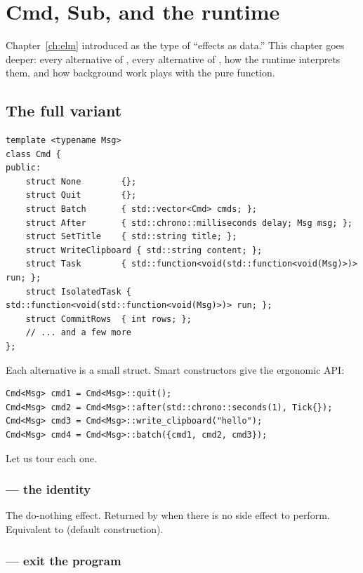 \chapter{Cmd, Sub, and the runtime}
\label{ch:cmdsub}

Chapter~\ref{ch:elm} introduced  as the type of
``effects as data.'' This chapter goes deeper: every alternative of
, every alternative of , how the runtime
interprets them, and how background work plays with the pure
 function.

\section{The full  variant}

\begin{lstlisting}
template <typename Msg>
class Cmd {
public:
    struct None        {};
    struct Quit        {};
    struct Batch       { std::vector<Cmd> cmds; };
    struct After       { std::chrono::milliseconds delay; Msg msg; };
    struct SetTitle    { std::string title; };
    struct WriteClipboard { std::string content; };
    struct Task        { std::function<void(std::function<void(Msg)>)> run; };
    struct IsolatedTask { std::function<void(std::function<void(Msg)>)> run; };
    struct CommitRows  { int rows; };
    // ... and a few more
};
\end{lstlisting}

Each alternative is a small struct. Smart constructors give the
ergonomic API:

\begin{lstlisting}
Cmd<Msg> cmd1 = Cmd<Msg>::quit();
Cmd<Msg> cmd2 = Cmd<Msg>::after(std::chrono::seconds(1), Tick{});
Cmd<Msg> cmd3 = Cmd<Msg>::write_clipboard("hello");
Cmd<Msg> cmd4 = Cmd<Msg>::batch({cmd1, cmd2, cmd3});
\end{lstlisting}

Let us tour each one.

\subsection{ --- the identity}

The do-nothing effect. Returned by  when there is no
side effect to perform. Equivalent to  (default
construction).

\subsection{ --- exit the program}

